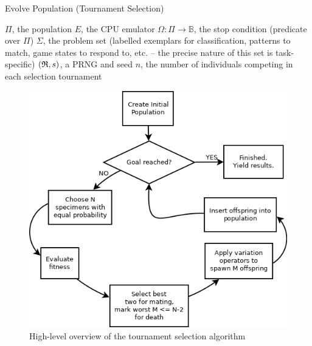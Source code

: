 \documentclass[12pt,glossary]{dalthesis}
\begin{document}
\begin{algorithm}
\caption{Evolve Population (Tournament Selection)}
\label{alg:evolve}
\begin{algorithmic}[1]
\REQUIRE $\Pi$, the population 
\REQUIRE $E$, the CPU emulator
\REQUIRE $\Omega: \Pi \rightarrow \mathbb{B} $, the stop condition (predicate over $\Pi$)
\REQUIRE $\Sigma$, the problem set (labelled exemplars for classification, patterns to match, game states to respond to, etc. -- the precise nature of this set is task-specific)
\REQUIRE $(\frak{R}, s)$, a PRNG and seed
\REQUIRE $n$, the number of individuals competing in each selection tournament
\REPEAT
{}
\label{alg:evolve:line:candidates}
\ENDFOR
{}
\label{alg:evolve:line:breed}
 
\UNTIL {$\Omega(\Pi) = \TRUE$}
\end{algorithmic}
\end{algorithm}

\begin{figure}[htbp]
\centering
\includegraphics[width=.9\linewidth]{../images/tournament_black.png}
\caption{\label{fig:org012d757}
High-level overview of the tournament selection algorithm}
\end{figure}
\end{document}
